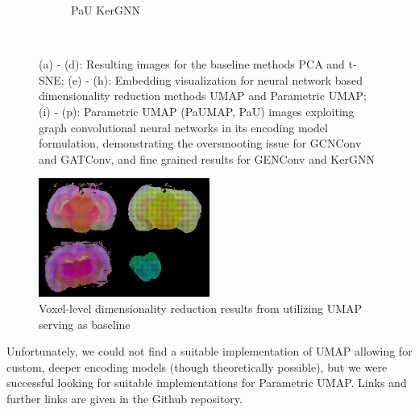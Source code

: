 \documentclass[]{article}
\begin{document}
\begin{figure}
\begin{subfigure}{.176\textwidth}
		\caption{PaU KerGNN}
		\label{fig:ParaUMAP_KerGNN_sag}
	\end{subfigure}\\

	\caption[Resulting visualizations for all dimensionality reduction images]{(a) - (d): Resulting images for the baseline methods PCA and t-SNE; (e) - (h): Embedding visualization for neural network based dimensionality reduction methods UMAP and Parametric UMAP; (i) - (p): Parametric UMAP (PaUMAP, PaU) images exploiting graph convolutional neural networks in its encoding model formulation, demonstrating the oversmooting issue for GCNConv and GATConv, and fine grained results for GENConv and KerGNN}
	\label{fig:dim_red_vis}
\end{figure}


\begin{figure}
	\centering
	
	\includegraphics[width=0.5\textwidth]{figures/graphiss_anlaysis.jpg}
	
	\caption[Voxel-level dimensionality reduction baseline results]{Voxel-level dimensionality reduction results from \citet{Partel2020} utilizing UMAP serving as baseline}
	\label{fig:baseline_vis}
\end{figure}



Unfortunately, we could not find a suitable implementation of UMAP allowing for custom, deeper encoding models (though theoretically possible), but we were successful looking for suitable implementations for Parametric UMAP. Links and further links are given in the Github repository. \\
\end{document}
